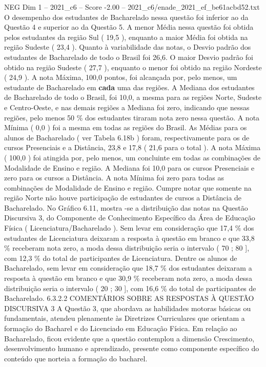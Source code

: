 \begin{textsample}{NEG Dim 1 – 2021\_c6 – Score -2.00 – 2021\_c6/enade\_2021\_ef\_be61acbd52.txt}
O desempenho dos estudantes de Bacharelado nessa questão foi inferior ao da Questão 4 e superior ao da Questão 5.
A menor Média nessa questão foi obtida pelos estudantes da região Sul ( 19,5 ), enquanto a maior Média foi obtida na região Sudeste ( 23,4 ).
Quanto à variabilidade das notas, o Desvio padrão dos estudantes de Bacharelado de todo o Brasil foi 26,6.
O maior Desvio padrão foi obtido na região Sudeste ( 27,7 ), enquanto o menor foi obtido na região Nordeste ( 24,9 ).
A nota Máxima, 100,0 pontos, foi alcançada por, pelo menos, um estudante de Bacharelado em \textbf{cada} uma das regiões.
A Mediana dos estudantes de Bacharelado de todo o Brasil, foi 10,0, a mesma para as regiões Norte, Sudeste e Centro-Oeste, e nas demais regiões a Mediana foi zero, indicando que nessas regiões, pelo menos 50 \% dos estudantes tiraram nota zero nessa questão.
A nota Mínima ( 0,0 ) foi a mesma em todas as regiões do Brasil.
As Médias para os alunos de Bacharelado ( ver Tabela 6.18b ) foram, respectivamente para os de cursos Presenciais e a Distância, 23,8 e 17,8 ( 21,6 para o total ).
A nota Máxima ( 100,0 ) foi atingida por, pelo menos, um concluinte em todas as combinações de Modalidade de Ensino e região.
A Mediana foi 10,0 para os cursos Presenciais e zero para os cursos a Distância.
A nota Mínima foi zero para todas as combinações de Modalidade de Ensino e região.
Cumpre notar que somente na região Norte não houve participação de estudantes de cursos a Distância de Bacharelado.
No Gráfico 6.11, mostra -se a distribuição das notas na Questão Discursiva 3, do Componente de Conhecimento Específico da Área de Educação Física ( Licenciatura/Bacharelado ).
Sem levar em consideração que 17,4 \% dos estudantes de Licenciatura deixaram a resposta à questão em branco e que 33,8 \% receberam nota zero, a moda dessa distribuição seria o intervalo ( 70 ; 80 ], com 12,3 \% do total de participantes de Licenciatura.
Dentre os alunos de Bacharelado, sem levar em consideração que 18,7 \% dos estudantes deixaram a resposta à questão em branco e que 30,9 \% receberam nota zero, a moda dessa distribuição seria o intervalo ( 20 ; 30 ], com 16,6 \% do total de participantes de Bacharelado. 6.3.2.2 COMENTÁRIOS SOBRE AS RESPOSTAS À QUESTÃO DISCURSIVA 3 A Questão 3, que abordava as habilidades motoras básicas ou fundamentais, atendeu plenamente às Diretrizes Curriculares que orientam a formação do Bacharel e do Licenciado em Educação Física.
Em relação ao Bacharelado, ficou evidente que a questão contemplou a dimensão Crescimento, desenvolvimento humano e aprendizado, presente como componente específico do conteúdo que norteia a formação do bacharel.

\end{textsample}

